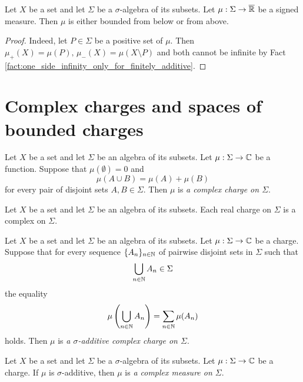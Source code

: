\begin{corollary}\label{corollary:signed_measures_are_one_sided_bounded}
    Let $X$ be a set and let $\Sigma$ be a $\sigma$-algebra of its subsets. Let $\mu:\Sigma \rightarrow \overline{{\mathbb R}}$ be a signed measure. Then $\mu$ is either bounded from below or from above.
\end{corollary}
\begin{proof}
    Indeed, let $P \in \Sigma$ be a positive set of $\mu$. Then $\mu_+(X) = \mu(P),\,\mu_-(X) = \mu(X\setminus P)$ and both cannot be infinite by Fact \ref{fact:one_side_infinity_only_for_finitely_additive}.
\end{proof}

\section{Complex charges and spaces of bounded charges}

\begin{definition}
    Let $X$ be a set and let $\Sigma$ be an algebra of its subsets. Let $\mu:\Sigma \rightarrow {\mathbb C}$ be a function. Suppose that $\mu(\emptyset) = 0$ and
    $$\mu(A \cup B) = \mu(A) + \mu(B)$$
    for every pair of disjoint sets $A,B \in \Sigma$. Then $\mu$ is \textit{a complex charge on $\Sigma$}.
\end{definition}

\begin{remark}\label{remark:each_real_charge_is_complex}
    Let $X$ be a set and let $\Sigma$ be an algebra of its subsets. Each real charge on $\Sigma$ is a complex on $\Sigma$.
\end{remark}

\begin{definition}
    Let $X$ be a set and let $\Sigma$ be an algebra of its subsets. Let $\mu:\Sigma \rightarrow {\mathbb C}$ be a charge. Suppose that for every sequence $\{A_n\}_{n\in {\mathbb N}}$ of pairwise disjoint sets in $\Sigma$ such that
    $$\bigcup_{n\in {\mathbb N}}A_n \in \Sigma$$
    the equality
    $$\mu\left(\bigcup_{n\in {\mathbb N}}A_n\right) = \sum_{n \in {\mathbb N}}\mu(A_n)$$
    holds. Then $\mu$ is \textit{a $\sigma$-additive complex charge on $\Sigma$}.
\end{definition}

\begin{definition}
    Let $X$ be a set and let $\Sigma$ be a $\sigma$-algebra of its subsets. Let $\mu:\Sigma \rightarrow {\mathbb C}$ be a charge. If $\mu$ is $\sigma$-additive, then $\mu$ is \textit{a complex measure on $\Sigma$}.
\end{definition}

